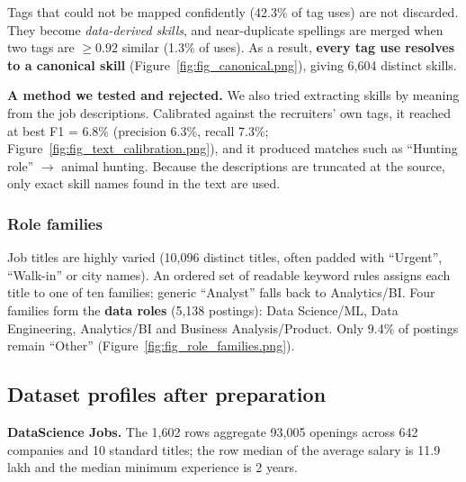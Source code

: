 Tags that could not be mapped confidently (42.3\% of tag uses) are not discarded. They become
\emph{data-derived skills}, and near-duplicate spellings are merged when two tags are
$\geq 0.92$ similar (1.3\% of uses). As a result, \textbf{every tag use resolves to a canonical skill}
(Figure~\ref{fig:fig_canonical.png}), giving 6,604 distinct skills.


\textbf{A method we tested and rejected.} We also tried extracting skills by meaning from the job
descriptions. Calibrated against the recruiters' own tags, it reached at best F1 = 6.8\%
(precision 6.3\%, recall 7.3\%; Figure~\ref{fig:fig_text_calibration.png}), and it produced
matches such as ``Hunting role'' $\rightarrow$ animal hunting. Because the descriptions are
truncated at the source, only exact skill names found in the text are used.


\subsubsection*{Role families}\label{sec:families}

Job titles are highly varied (10,096 distinct titles, often padded with ``Urgent'', ``Walk-in'' or city
names). An ordered set of readable keyword rules assigns each title to one of ten families; generic
``Analyst'' falls back to Analytics/BI. Four families form the \textbf{data roles} (5,138 postings):
Data Science/ML, Data Engineering, Analytics/BI and Business Analysis/Product. Only 9.4\% of postings
remain ``Other'' (Figure~\ref{fig:fig_role_families.png}).


\subsection{Dataset profiles after preparation}

\textbf{DataScience Jobs.} The 1,602 rows aggregate 93,005 openings across 642 companies and 10
standard titles; the row median of the average salary is 11.9 lakh and the median minimum experience
is 2 years.

